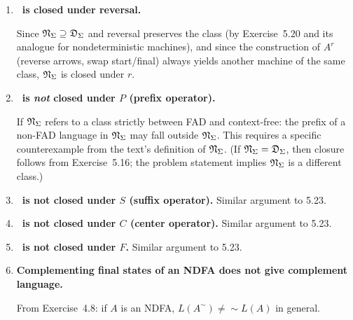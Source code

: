 \begin{enumerate}[{5.}1. ]
\begin{enumerate}[(a)]
  \item \textbf{\NSIG\ is closed under $G$.}  In the textbook, $\NSIG$ denotes the class of languages recognized by nondeterministic finite automata (equivalently, $\NSIG=\DSIG$ by the subset construction). Since $\DSIG$ is not closed under $G$ (part~(a)), $\NSIG$ is not closed under $G$ either. If the problem intends a broader $\NSIG$ (e.g., languages accepted by nondeterministic PDAs, i.e., the CFLs), then closure holds: build a PDA that nondeterministically guesses $w$, pushes $w$ while reading $w^r$ (the first half), then pops while verifying the second half equals $w$.

  \item \textbf{\NSIG\ is not closed under $b$.}  Left as exercise per text.
\end{enumerate}

\item \textbf{\NSIG\ is closed under reversal.}

Since $\mathfrak{N}_\Sigma\supseteq\mathfrak{D}_\Sigma$ and reversal preserves the class (by Exercise~5.20 and its analogue for nondeterministic machines), and since the construction of $A^r$ (reverse arrows, swap start/final) always yields another machine of the same class, $\NSIG$ is closed under $r$.

\item \textbf{\NSIG\ is \emph{not} closed under $P$ (prefix operator).}

If $\NSIG$ refers to a class strictly between FAD and context-free: the prefix of a non-FAD language in $\NSIG$ may fall outside $\NSIG$.  This requires a specific counterexample from the text's definition of $\NSIG$.  (If $\NSIG=\DSIG$, then closure follows from Exercise~5.16; the problem statement implies $\NSIG$ is a different class.)

\item \textbf{\NSIG\ is not closed under $S$ (suffix operator).}  Similar argument to 5.23.

\item \textbf{\NSIG\ is not closed under $C$ (center operator).}  Similar argument to 5.23.

\item \textbf{\NSIG\ is not closed under $F$.}  Similar argument to 5.23.

\item \textbf{Complementing final states of an NDFA does not give complement language.}

From Exercise~4.8: if $A$ is an NDFA, $L(A^\sim)\neq\sim L(A)$ in general.


\end{enumerate}
